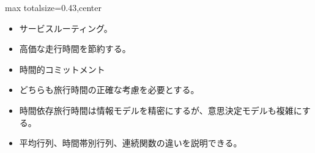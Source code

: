 \clearpage
{}
\begin{minipage}[t]{0.405\textwidth}
\begin{adjustbox}{max totalsize={\textwidth}{0.43\textheight},center}
\begin{minipage}{\textwidth}\scriptsize
{}\begin{itemize}
\item サービスルーティング。
\item 高価な走行時間を節約する。
\item 時間的コミットメント
\item どちらも旅行時間の正確な考慮を必要とする。
\end{itemize}\begin{itemize}
\item 時間依存旅行時間は情報モデルを精密にするが、意思決定モデルも複雑にする。
\item 平均行列、時間帯別行列、連続関数の違いを説明できる。
\end{itemize}
\end{minipage}
\end{adjustbox}
\end{minipage}\hfill
